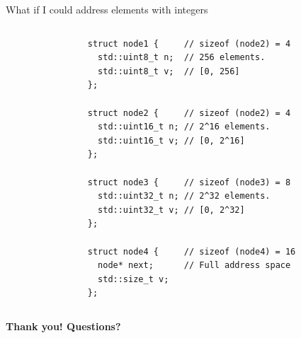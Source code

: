 \documentclass[10pt,aspectratio=169]{beamer}
\begin{document}
\begin{frame}[fragile]{What if I could address elements with integers}
\begin{columns}
\begin{column}{0.5\textwidth}
\begin{tikzpicture}[scale=1.0]
\end{tikzpicture}

\end{column}
\begin{column}{0.5\textwidth}

\begin{lstlisting}
struct node1 {     // sizeof (node2) = 4
  std::uint8_t n;  // 256 elements.
  std::uint8_t v;  // [0, 256]
};

struct node2 {     // sizeof (node2) = 4
  std::uint16_t n; // 2^16 elements.
  std::uint16_t v; // [0, 2^16]
};

struct node3 {     // sizeof (node3) = 8
  std::uint32_t n; // 2^32 elements.
  std::uint32_t v; // [0, 2^32]
};

struct node4 {     // sizeof (node4) = 16
  node* next;      // Full address space
  std::size_t v;
};

\end{lstlisting}

\end{column}
\end{columns}

\end{frame}

\begin{frame}{}
    \vspace{1cm}
    \begin{center}
        {\Large \bf Thank you! Questions?} 
    \end{center}
\end{frame}
\end{document}
